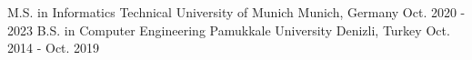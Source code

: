 

\begin{cventries}

  \cventry
  {M.S. in Informatics} %
  {Technical University of Munich} %
  {Munich, Germany} %
  {Oct. 2020 - 2023} %
  {}
  \cventry
  {B.S. in Computer Engineering} %
  {Pamukkale University} %
  {Denizli, Turkey} %
  {Oct. 2014 - Oct. 2019} %
  {}
\end{cventries}
